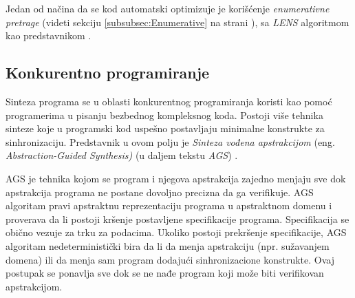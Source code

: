 Jedan od načina da se kod automatski optimizuje je korišćenje  \emph{enumerativne pretrage} (videti sekciju \ref{subsubsec:Enumerative} na strani \pageref{subsubsec:Enumerative}), sa \emph{LENS} algoritmom kao predstavnikom \cite{ScalingUpSuperoptimization}.


\subsection{Konkurentno programiranje}
\label{subsec:KonkurentnoProgramiranje}

Sinteza programa se u oblasti konkurentnog programiranja koristi kao pomoć programerima u pisanju bezbednog kompleksnog koda. Postoji više tehnika sinteze koje u programski kod uspešno postavljaju minimalne konstrukte za sinhronizaciju. Predstavnik u ovom polju je \emph{Sinteza vođena apstrakcijom} (eng. \emph{Abstraction-Guided Synthesis)} (u daljem tekstu \emph{AGS})  \cite{AGS}.

AGS je tehnika kojom se program i njegova apstrakcija zajedno menjaju sve dok apstrakcija programa ne postane dovoljno precizna da ga verifikuje. AGS algoritam pravi apstraktnu reprezentaciju programa u apstraktnom domenu i proverava da li postoji kršenje postavljene specifikacije programa. Specifikacija se obično vezuje za trku za podacima. Ukoliko postoji prekršenje specifikacije, AGS algoritam nedeterministički bira da li da menja apstrakciju (npr. sužavanjem domena) ili da menja sam program dodajući sinhronizacione konstrukte. Ovaj postupak se ponavlja sve dok se ne nađe program koji može biti verifikovan apstrakcijom.
